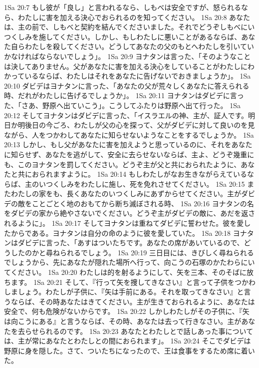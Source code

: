 1Sa 20:7  もし彼が「良し」と言われるなら、しもべは安全ですが、怒られるなら、わたしに害を加える決心でおられるのを知ってください。
1Sa 20:8  あなたは、主の前で、しもべと契約を結んでくださいました。それでどうぞしもべにいつくしみを施してください。しかし、もしわたしに悪いことがあるならば、あなた自らわたしを殺してください。どうしてあなたの父のもとへわたしを引いていかなければならないでしょう」。
1Sa 20:9  ヨナタンは言った、「そのようなことは決してありません。父があなたに害を加える決心をしていることがわたしにわかっているならば、わたしはそれをあなたに告げないでおきましょうか」。
1Sa 20:10  ダビデはヨナタンに言った、「あなたの父が荒々しくあなたに答えられる時、だれがわたしに告げるでしょうか」。
1Sa 20:11  ヨナタンはダビデに言った、「さあ、野原へ出ていこう」。こうしてふたりは野原へ出て行った。
1Sa 20:12  そしてヨナタンはダビデに言った、「イスラエルの神、主が、証人です。明日か明後日の今ごろ、わたしが父の心を探って、父がダビデに対して良いのを見ながら、人をつかわしてあなたに知らせないようなことをするでしょうか。
1Sa 20:13  しかし、もし父があなたに害を加えようと思っているのに、それをあなたに知らせず、あなたを逃がして、安全に去らせないならば、主よ、どうぞ幾重にも、このヨナタンを罰してください。どうぞ主が父と共におられたように、あなたと共におられますように。
1Sa 20:14  もしわたしがなお生きながらえているならば、主のいつくしみをわたしに施し、死を免れさせてください。
1Sa 20:15  またわたしの家をも、長くあなたのいつくしみにあずからせてください。主がダビデの敵をことごとく地のおもてから断ち滅ぼされる時、
1Sa 20:16  ヨナタンの名をダビデの家から絶やさないでください。どうぞ主がダビデの敵に、あだを返されるように」。
1Sa 20:17  そしてヨナタンは重ねてダビデに誓わせた。彼を愛したからである。ヨナタンは自分の命のように彼を愛していた。
1Sa 20:18  ヨナタンはダビデに言った、「あすはついたちです。あなたの席があいているので、どうしたのかと尋ねられるでしょう。
1Sa 20:19  三日目には、きびしく尋ねられるでしょうから、先にあなたが隠れた場所へ行って、向こうの石塚のかたわらにいてください。
1Sa 20:20  わたしは的を射るようにして、矢を三本、そのそばに放ちます。
1Sa 20:21  そして、『行って矢を捜してきなさい』と言って子供をつかわしましょう。わたしが子供に、『矢は手前にある。それを取ってきなさい』と言うならば、その時あなたはきてください。主が生きておられるように、あなたは安全で、何も危険がないからです。
1Sa 20:22  しかしわたしがその子供に、『矢は向こうにある』と言うならば、その時、あなたは去って行きなさい。主があなたを去らせられるのです。
1Sa 20:23  あなたとわたしとで話しあった事については、主が常にあなたとわたしとの間におられます」。
1Sa 20:24  そこでダビデは野原に身を隠した。さて、ついたちになったので、王は食事をするため席に着いた。
